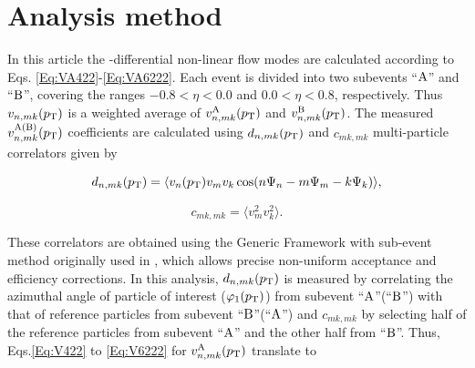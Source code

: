 \documentclass[ALICE,manyauthors]{cernphprep}
\begin{document}


\section{Analysis method}
\label{Sec:Analysis method}
In this article the \pT-differential non-linear flow modes are calculated according to Eqs. \ref{Eq:VA422}-\ref{Eq:VA6222}. Each event is divided into two subevents ``$\rm{A}$'' and ``$\rm{B}$'', covering the ranges $-0.8< \eta < 0.0$ and $0.0 <\eta< 0.8$, respectively. Thus $v_{n,mk}(p_{\rm{T}})$ is a weighted average of $v_{n,mk}^{\rm{A}}(p_{\rm{T}})$ and $v_{n,mk}^{\rm{B}}(p_{\rm{T}})$. The measured $v_{n,mk}^{\rm{A(B)}}(p_{\rm{T}})$ coefficients are calculated using $d_{n,mk}(p_{\rm{T}})$ and $c_{mk,mk}$ multi-particle correlators given by

\begin{equation}
d_{n,mk}(p_{\rm{T}}) = \langle v_{n}(p_{\rm{T}})v_{m}v_{k}\cos(n\Psi_{n}-m\Psi_{m}-k\Psi_{k}) \rangle,
\label{Eq:dnmki}
\end{equation}


\begin{equation}
c_{mk,mk} = \langle v_{m}^{2}v_{k}^{2}\rangle.
\label{Eq:cmkimki}
\end{equation}

 
These correlators are obtained using the Generic Framework with sub-event method originally used in \cite{Acharya:2017zfg}, which allows precise non-uniform acceptance and efficiency corrections. In this analysis, $d_{n,mk}(p_{\rm{T}})$ is measured by correlating the azimuthal angle of particle of interest ($\varphi_{1}(p_{\rm T})$) from subevent ``$\rm{A}$''(``$\rm{B}$'') with that of reference particles from subevent ``$\rm{B}$''(``$\rm{A}$'') and $c_{mk,mk}$ by selecting half of the reference particles from subevent ``$\rm{A}$'' and the other half from ``$\rm{B}$''. Thus, Eqs.\ref{Eq:V422} to \ref{Eq:V6222} for $v_{n,mk}^{\rm{A}}(p_{\rm{T}})$ translate to
\end{document}
